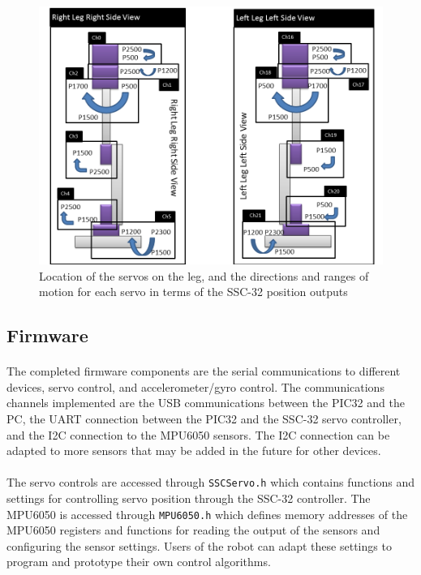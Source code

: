 \documentclass[titlepage,letterpaper,12pt]{article}
\begin{document}
\begin{figure}
  \centering
    \includegraphics[width=1.0\textwidth]{figures/LegConfiguration.png}
  \caption{Location of the servos on the leg, and the directions and ranges of
  motion for each servo in terms of the SSC-32 position outputs}
  \label{servosetupfig}
\end{figure}

\subsection{Firmware}
\paragraph{}The completed firmware components are the serial
communications to different devices, servo control, and accelerometer/gyro
control.  The communications channels implemented are the USB communications
between the PIC32 and the PC, the UART connection between the PIC32 and the
SSC-32 servo controller, and the I2C connection to the MPU6050 sensors. The I2C
connection can be adapted to more sensors that may be added in the future for
other devices.

\paragraph{}The servo controls are accessed through \verb!SSCServo.h! which
contains functions and settings for controlling servo position through the
SSC-32 controller. The MPU6050 is accessed through \verb!MPU6050.h! which
defines memory addresses of the MPU6050 registers and functions for reading the
output of the sensors and configuring the sensor settings. Users of the
robot can adapt these settings to program and prototype their own control
algorithms.
\end{document}
